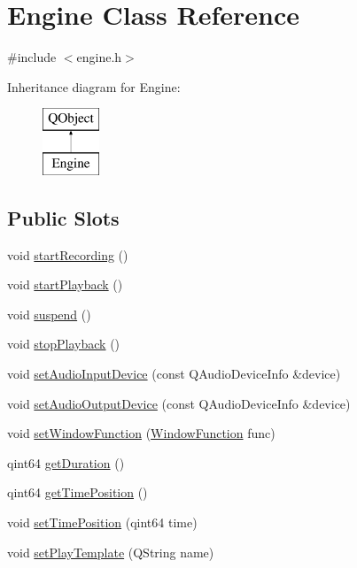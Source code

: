 \hypertarget{class_engine}{}\section{Engine Class Reference}
\label{class_engine}


{\ttfamily \#include $<$engine.\+h$>$}

Inheritance diagram for Engine\+:\begin{figure}[H]
\begin{center}
\leavevmode
\includegraphics[height=2.000000cm]{class_engine}
\end{center}
\end{figure}
\subsection*{Public Slots}
\begin{DoxyCompactItemize}
\item 
void \hyperlink{class_engine_a642ce405fe251d783cd5766925286477}{start\+Recording} ()
\item 
void \hyperlink{class_engine_aa8314a12e4d220c5540605dd8ac3bd3a}{start\+Playback} ()
\item 
void \hyperlink{class_engine_a5a6a21b73b9571b41d45eadec6a86edd}{suspend} ()
\item 
void \hyperlink{class_engine_a382efef270e3ebe98e1b26945d080fa9}{stop\+Playback} ()
\item 
void \hyperlink{class_engine_a14fc1862412916b29b6d885d6e4865bf}{set\+Audio\+Input\+Device} (const Q\+Audio\+Device\+Info \&device)
\item 
void \hyperlink{class_engine_ae45195b977998e53441aed3006c9a35e}{set\+Audio\+Output\+Device} (const Q\+Audio\+Device\+Info \&device)
\item 
void \hyperlink{class_engine_ad36cd20d882c533e02cf6164cbc6e774}{set\+Window\+Function} (\hyperlink{spectrum_8h_adae4545e1609513867a86cc5e91fc1d4}{Window\+Function} func)
\item 
qint64 \hyperlink{class_engine_a165b8efe8055b3da607db4a6bb977a0c}{get\+Duration} ()
\item 
qint64 \hyperlink{class_engine_a9861606422c32d2dcd78ca7666f43785}{get\+Time\+Position} ()
\item 
void \hyperlink{class_engine_a52d2f257b439735853144f7cb4199f86}{set\+Time\+Position} (qint64 time)
\item 
void \hyperlink{class_engine_a56fbf122df09a4f2c7d8ef053b355459}{set\+Play\+Template} (Q\+String name)
\end{DoxyCompactItemize}
